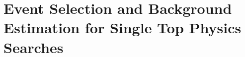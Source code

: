 \section{Event Selection and Background Estimation for Single Top Physics Searches}\label{sec:tzq-search}

